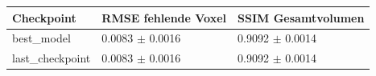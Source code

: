 \begin{tabular}{lll}
\toprule
Checkpoint & RMSE fehlende Voxel & SSIM Gesamtvolumen \\
\midrule
best_model & 0.0083 $\pm$ 0.0016 & 0.9092 $\pm$ 0.0014 \\
last_checkpoint & 0.0083 $\pm$ 0.0016 & 0.9092 $\pm$ 0.0014 \\
\bottomrule
\end{tabular}
